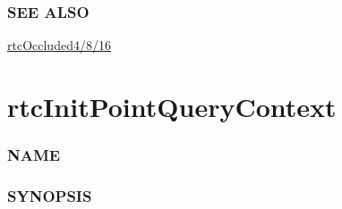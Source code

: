 \subsubsection{SEE ALSO}\label{see-also}

\hyperref[rtcoccluded4816]{rtcOccluded4/8/16}

\pagebreak

\section{rtcInitPointQueryContext}\label{rtcinitpointquerycontext}

\subsubsection{NAME}\label{name}

\begin{Shaded}
\begin{Highlighting}[]
\OperatorTok{{-}}\OperatorTok{(}
\OperatorTok{(}\OperatorTok{{-})}\OperatorTok{)} 
\end{Highlighting}
\end{Shaded}

\subsubsection{SYNOPSIS}\label{synopsis}

